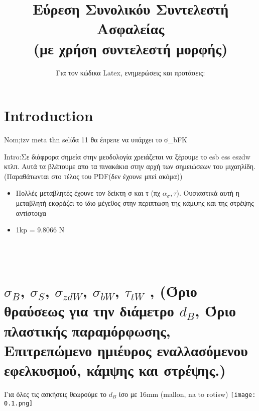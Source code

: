 \documentclass{article}
\title{Εύρεση Συνολικόυ Συντελεστή Ασφαλείας 
\\(με χρήση συντελεστή μορφής)}
\author{Για τον κώδικα Latex, ενημερώσεις και προτάσεις:
}
\date{}
\begin{document}
\maketitle
\tableofcontents
\section{Introduction}




Nom;izv meta thn selίδα 11 θα έπρεπε να υπάρχει το σ_bFK


Intro:Σε διάφρορα σημεία στην μεοδολογία χρειάζεται να ξέρουμε το esb ess eszdw κτλπ. Αυτά τα βλέπουμε απο τα πινακάκια στην αρχή των σημειώσεων του μιχαηλίδη.(Παραθάτωνται στο τέλος του PDF(δεν έχουνε μπεί ακόμα))
\begin{itemize}
    \item Πολλές μεταβλητές έχουνε τον δείκτη σ και τ (πχ $α_σ,τ$). Ουσιαστικά αυτή η μεταβλητή εκφράζει το ίδιο μέγεθος στην περιπτωση της κάμψης και της στρέψης αντίστοιχα
    \item 1kp = 9.8066 N
\end{itemize}
\\
\\

\section{\textbf{\huge $σ_Β$, $σ_S$, $σ_{zdW}$, $σ_{bW}$, $τ_{tW}$ },   (Όριο θραύσεως για την διάμετρο $d_B$, Όριο πλαστικής παραμόρφωσης, Επιτρεπώμενο ημιέυρος εναλλασόμενου εφελκυσμού, κάμψης και στρέψης.)}
Για όλες τις ασκήσεις θεωρούμε το $d_B$ ίσο με 16mm (mallon, na to rotisw)
\texttt{[image: 0.1.png]}
\end{document}
